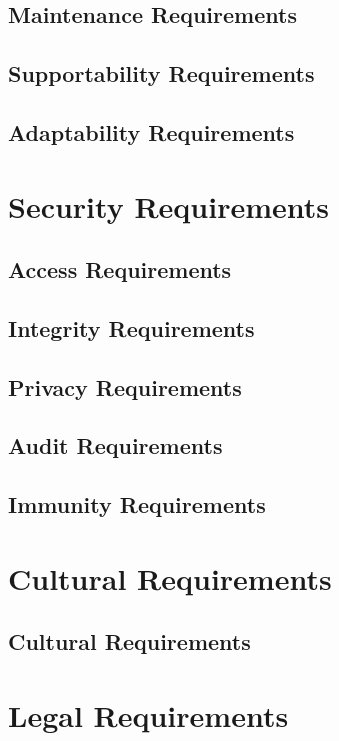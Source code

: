 \documentclass{article}
\begin{document}
\subsection{Maintenance Requirements}


\subsection{Supportability Requirements}


\subsection{Adaptability Requirements}


\section{Security Requirements}

\subsection{Access Requirements}


\subsection{Integrity Requirements}


\subsection{Privacy Requirements}


\subsection{Audit Requirements}

\subsection{Immunity Requirements}


\section{Cultural Requirements}
\subsection{Cultural Requirements}


\section{Legal Requirements}
\end{document}

